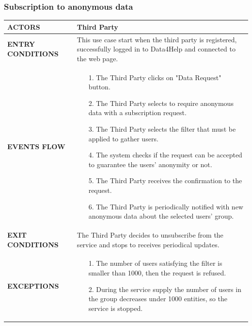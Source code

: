 \documentclass[a4paper]{article}
\begin{document}
\subsubsection{Subscription to anonymous data}
\begin{center}
    \begin{tabular}{l || p{8cm} ||}
        \bf{ACTORS} & Third Party \\ \hline
        \bf{ENTRY CONDITIONS} & This use case start when the third party is registered, successfully logged in to Data4Help and connected to the web page.\\ \hline
        \bf{EVENTS FLOW} & \begin{itemize}[noitemsep, topsep=0cm, leftmargin=*] \vspace{-0.2cm}
            \item[1.] The Third Party clicks on "Data Request" button.
            \item[2.] The Third Party selects to require anonymous data with a subscription request.
            \item[3.] The Third Party selects the filter that must be applied to gather users.
            \item[4.] The system checks if the request can be accepted to guarantee the users' anonymity or not.
            \item[5.] The Third Party receives the confirmation to the request.
            \item[6.] The Third Party is periodically notified with new anonymous data about the selected users' group. 
        \end{itemize}
        \\ \hline
        \bf{EXIT CONDITIONS} & The Third Party decides to unsubscribe from the service and stops to receives periodical updates.\\ \hline
        \bf{EXCEPTIONS} &\begin{itemize}[noitemsep, topsep=0cm, leftmargin=*] \vspace{-0.2cm}
            \item[1.] The number of users satisfying the filter is smaller than 1000, then the request is refused.
            \item[2.] During the service supply the number of users in the group decreases under 1000 entities, so the service is stopped.
        \end{itemize}
        \\ \hline \hline
    \end{tabular}
\end{center}
\end{document}

